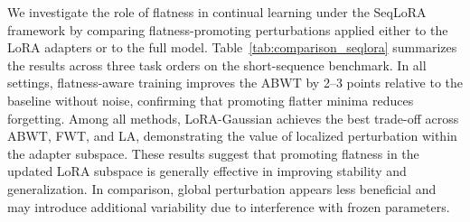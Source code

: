 \documentclass[letterpaper]{article} %
\begin{document}
We investigate the role of flatness in continual learning under the SeqLoRA framework by comparing flatness-promoting perturbations applied either to the LoRA adapters or to the full model. Table~\ref{tab:comparison_seqlora} summarizes the results across three task orders on the short-sequence benchmark. In all settings, flatness-aware training improves the ABWT by 2–3 points relative to the baseline without noise, confirming that promoting flatter minima reduces forgetting. Among all methods, LoRA-Gaussian achieves the best trade-off across ABWT, FWT, and LA, demonstrating the value of localized perturbation within the adapter subspace. These results suggest that promoting flatness in the updated LoRA subspace is generally effective in improving stability and generalization. In comparison, global perturbation appears less beneficial and may introduce additional variability due to interference with frozen parameters.










\end{document}
